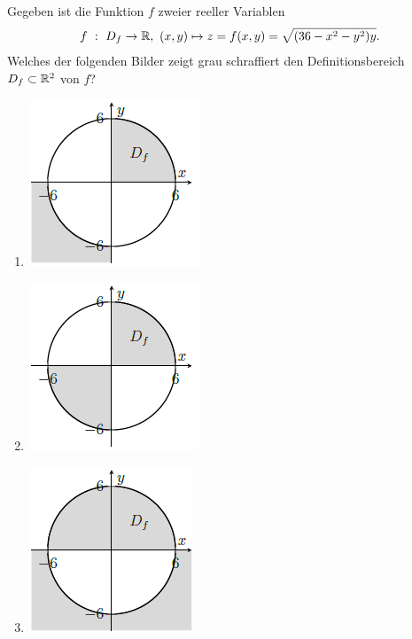 \subsection*{}
Gegeben ist die Funktion $ f $ zweier reeller Variablen
\begin{align*}
	f \ : \ D_f \to \mathbb{R}, \ (x,y) \mapsto z = f(x,y) =\sqrt{(36 - x^2 -y^2) y}.
\end{align*}
Welches der folgenden Bilder zeigt grau schraffiert den Definitionsbereich $ D_f \subset \mathbb{R}^2 $ von $ f $?
\renewcommand{\labelenumi}{(\alph{enumi})}
\begin{enumerate}
\item 
\begin{center}
	\includegraphics[scale=0.6]{pictures/3_4_a}
\end{center}
\item 
\begin{center}
	\includegraphics[scale=0.6]{pictures/3_4_b}
\end{center}
\item
\begin{center}
	\includegraphics[scale=0.6]{pictures/3_4_c}

\end{center}
\end{enumerate}
